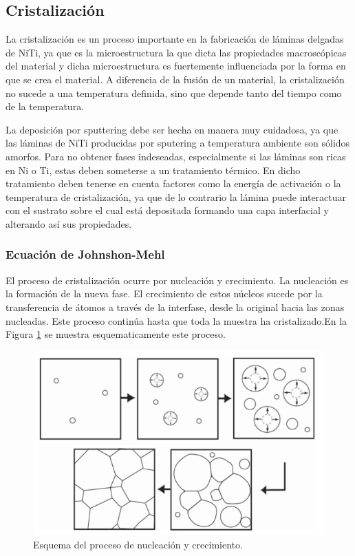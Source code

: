 \documentclass{article}
\theoremstyle{definition}
\theoremstyle{remark}
\begin{document}
\subsection{Cristalización}

La cristalización es un proceso importante en la fabricación de láminas delgadas de NiTi, ya que es la microestructura la que dicta las propiedades macroscópicas del material y dicha microestructura es fuertemente influenciada por la forma en que se crea el material. A diferencia de la fusión de un material, la cristalización no sucede a una temperatura definida, sino que depende tanto del tiempo como de la temperatura.

La deposición por sputtering debe ser hecha en manera muy cuidadosa, ya que las láminas de NiTi producidas por sputering a temperatura ambiente son sólidos amorfos. Para no obtener fases indeseadas, especialmente si las láminas son ricas en Ni o Ti, estas deben someterse a un tratamiento térmico. En dicho tratamiento deben tenerse en cuenta factores como la energía de activación o la temperatura de cristalización, ya que de lo contrario la lámina puede interactuar con el sustrato sobre el cual está depositada formando una capa interfacial y alterando así sus propiedades.

\subsubsection{Ecuación de Johnshon-Mehl}

 El proceso de cristalización ocurre por nucleación y crecimiento. La nucleación es la formación de la nueva fase. El crecimiento de estos núcleos sucede por la transferencia de átomos a través de la interfase, desde la original hacia las zonas nucleadas. Este proceso continúa hasta que toda la muestra ha cristalizado.En la Figura \ref{cristalization} se muestra esquematicamente este proceso.
 \begin{figure}[H]
 	\centering
	\includegraphics[scale=0.5]{img/cristalization.png}
 	\caption{Esquema del proceso de nucleación y crecimiento.}
	\label{cristalization}
\end{figure} 
\end{document}
